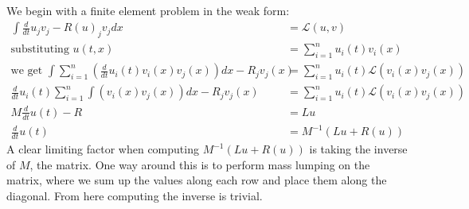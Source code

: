 \documentclass{article}
\begin{document}
We begin with a finite element problem in the weak form:
\begin{align*}
\int \frac d{dt}u_j v_j - R(u)_j v_j dx &= \mathcal{L}(u,v)\\
\text{substituting } u(t,x) &= \sum_{i=1}^n u_i(t)v_i(x)\\
\text{we get } \int\sum_{i=1}^n(\frac d{dt}u_i(t)v_i(x)v_j(x))dx - R_jv_j(x) &= \sum_{i=1}^n u_i(t)\mathcal{L}(v_i(x)v_j(x))\\
\frac d{dt}u_i(t)\sum_{i=1}^n\int(v_i(x)v_j(x))dx - R_jv_j(x) &= \sum_{i=1}^n u_i(t)\mathcal{L}(v_i(x)v_j(x))\\
M\frac d{dt}u(t) - R &= Lu\\
\frac d{dt}u(t) &= M^{-1}(Lu + R(u))
\end{align*}
A clear limiting factor when computing $M^{-1}(Lu + R(u))$ is taking the inverse of $M$, the matrix.
One way around this is to perform mass lumping on the matrix, where we sum up the values along each row and place them along the diagonal.
From here computing the inverse is trivial.

\clearpage
\newpage


\end{document}
